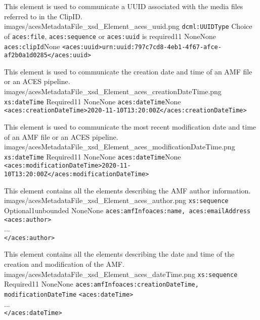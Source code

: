 		{This element is used to communicate a UUID associated with the media files referred to in the ClipID.}
		{images/acesMetadataFile_xsd_Element_aces_uuid.png}
		{\texttt{dcml:UUIDType}}
		{Choice of \texttt{aces:file}, \texttt{aces:sequence} or \texttt{aces:uuid} is required}{1}{1}
		{None}{None}
		{\texttt{aces:clipId}}{None}
		{\lstinline{<aces:uuid>urn:uuid:797c7cd8-4eb1-4f67-afce-af2b0a1d0285</aces:uuid>}}        
 
		{This element is used to communicate the creation date and time of an AMF file or an ACES pipeline.}
		{images/acesMetadataFile_xsd_Element_aces_creationDateTime.png}
		{\texttt{xs:dateTime}}
		{Required}{1}{1}
		{None}{None}
		{\texttt{aces:dateTime}}{None}
		{\lstinline{<aces:creationDateTime>2020-11-10T13:20:00Z</aces:creationDateTime>}}        

		{This element is used to communicate the most recent modification date and time of an AMF file or an ACES pipeline.}
		{images/acesMetadataFile_xsd_Element_aces_modificationDateTime.png}
		{\texttt{xs:dateTime}}
		{Required}{1}{1}
		{None}{None}
		{\texttt{aces:dateTime}}{None}
		{\lstinline{<aces:modificationDateTime>2020-11-10T13:20:00Z</aces:modificationDateTime>}}       

		{This element contains all the elements describing the AMF author information.}
		{images/acesMetadataFile_xsd_Element_aces_author.png}
		{\texttt{xs:sequence}}
		{Optional}{1}{unbounded}
		{None}{None}
		{\texttt{aces:amfInfo}}{\texttt{aces:name, aces:emailAddress}}
		{\lstinline{<aces:author>} \\
        ... \\
        \lstinline{</aces:author>}}       
                
		{This element contains all the elements describing the date and time of the creation and modification of the AMF.}
		{images/acesMetadataFile_xsd_Element_aces_dateTime.png}
		{\texttt{xs:sequence}}
		{Required}{1}{1}
		{None}{None}
		{\texttt{aces:amfInfo}}{\texttt{aces:creationDateTime, modificationDateTime}}
		{\lstinline{<aces:dateTime>} \\
        ... \\
        \lstinline{</aces:dateTime>}}             

